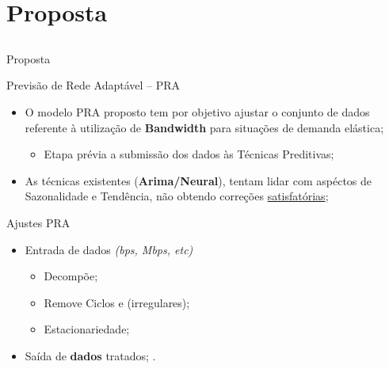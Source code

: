 \documentclass[aspectratio=169]{beamer}
\begin{document}
\section{Proposta}
\subsection{}
\begin{frame}{Proposta}
    \begin{block}{Previsão de Rede Adaptável -- PRA}
        \begin{itemize}\small
            \item O modelo PRA proposto tem por objetivo ajustar o conjunto de dados referente à utilização de \textbf{Bandwidth} para situações de demanda elástica;
            \begin{itemize}[square]\footnotesize
                \item Etapa prévia a submissão dos dados às Técnicas Preditivas; 
            \end{itemize}
            \item As técnicas existentes (\textbf{Arima/Neural}), tentam lidar com aspéctos de Sazonalidade e Tendência, não obtendo correções \underline{satisfatórias};
            
            
        \end{itemize}
    \end{block}
    \begin{block}{Ajustes PRA}
    \begin{itemize}\small
        \item Entrada de dados \emph{(bps, Mbps, etc)}
    
        \begin{itemize}[triangle]\footnotesize
            \item Decompõe;
            \item Remove Ciclos e (irregulares);
            \item Estacionariedade;
            
        \end{itemize}
        \item Saída de \textbf{dados} tratados;
        .
    \end{itemize}
    \end{block}
\end{frame}
\end{document}
